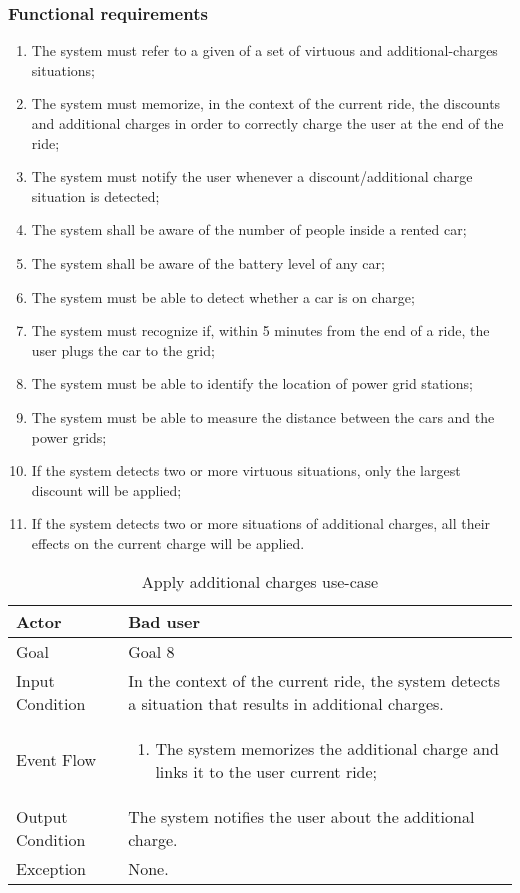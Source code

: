 \subsubsection{Functional requirements}
\begin{enumerate}
\item The system must refer to a given of a set of virtuous and additional-charges situations;
\item The system must memorize, in the context of the current ride, the discounts and additional charges in order to correctly charge the user at the end of the ride;
\item The system must notify the user whenever a discount/additional charge situation is detected;
\item The system shall be aware of the number of people inside a rented car;
\item The system shall be aware of the battery level of any car;
\item The system must be able to detect whether a car is on charge;
\item The system must recognize if, within 5 minutes from the end of a ride, the user plugs the car to the grid;
\item The system must be able to identify the location of power grid stations;
\item The system must be able to measure the distance between the cars and the power grids;
\item If the system detects two or more virtuous situations, only the largest discount will be applied;
\item If the system detects two or more situations of additional charges, all their effects on the current charge will be applied.
\end{enumerate}

\begin{table}[H]
\begin{center}
\begin{tabular}{p{} | p{}}
\hline
Actor & Bad user\\
\hline
Goal & Goal 8\\
\hline
Input Condition & In the context of the current ride, the system detects a situation that results in additional charges.\\
\hline
Event Flow & 
\begin{enumerate}
\item The system memorizes the additional charge and links it to the user current ride;
\end{enumerate} \\
\hline
Output Condition & The system notifies the user about the additional charge.\\
\hline
Exception & None.\\
\hline
\end{tabular}
\end{center}
\caption{Apply additional charges use-case}
\label{apply_additional_charges_uc}
\end{table}

